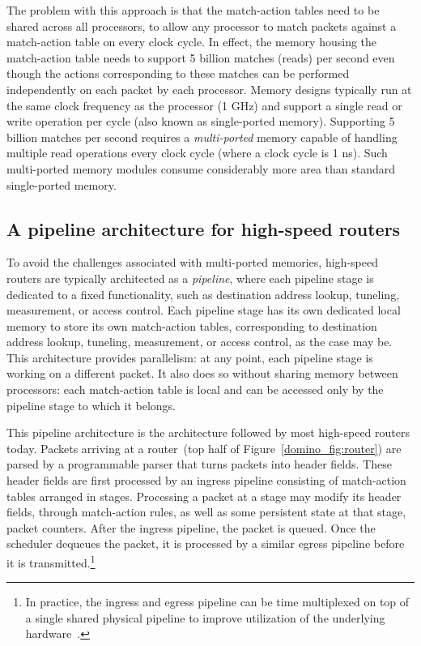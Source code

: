 The problem with this approach is that the match-action tables need to be
shared across all processors, to allow any processor to match packets against a
match-action table on every clock cycle. In effect, the memory housing the
match-action table needs to support 5 billion matches (reads) per second even
though the actions corresponding to these matches can be performed
independently on each packet by each processor. Memory designs typically run at
the same clock frequency as the processor (1 GHz) and support a single read or
write operation per cycle (also known as single-ported memory). Supporting 5
billion matches per second requires a {\em multi-ported} memory capable of
handling multiple read operations every clock cycle (where a clock cycle is 1
ns). Such multi-ported memory modules consume considerably more area than
standard single-ported memory.

\subsection{A pipeline architecture for high-speed routers}
To avoid the challenges associated with multi-ported memories, high-speed
routers are typically architected as a {\em pipeline}, where each pipeline
stage is dedicated to a fixed functionality, such as destination address
lookup, tuneling, measurement, or access control. Each pipeline stage has its
own dedicated local memory to store its own match-action tables, corresponding
to destination address lookup, tuneling, measurement, or access control, as the
case may be. This architecture provides parallelism: at any point, each
pipeline stage is working on a different packet. It also does so without
sharing memory between processors: each match-action table is local and can be
accessed only by the pipeline stage to which it belongs.

This pipeline architecture is the architecture followed by most high-speed
routers today. Packets arriving at a router~(top half of
Figure~\ref{domino_fig:router}) are parsed by a programmable parser that turns
packets into header fields. These header fields are first processed by an
ingress pipeline consisting of match-action tables arranged in stages.
Processing a packet at a stage may modify its header fields, through
match-action rules, as well as some persistent state at that stage, \eg packet
counters. After the ingress pipeline, the packet is queued. Once the scheduler
dequeues the packet, it is processed by a similar egress pipeline before it is
transmitted.\footnote{In practice, the ingress and egress pipeline can be time
multiplexed on top of a single shared physical pipeline to improve utilization
of the underlying hardware~\cite{rmt}.}

